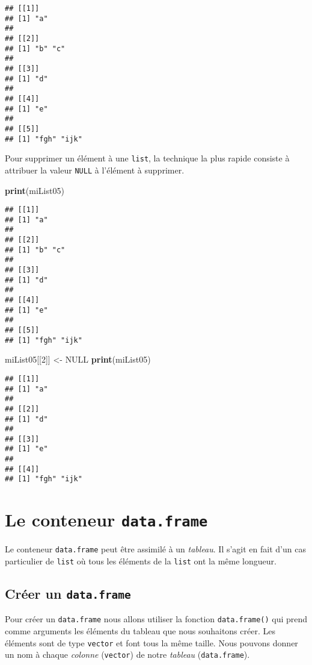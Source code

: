 \documentclass[]{book}
\newenvironment{Shaded}{\begin{snugshade}}{\end{snugshade}}
\newcommand{\KeywordTok}[1]{\textcolor[rgb]{0.13,0.29,0.53}{\textbf{#1}}}
\newcommand{\DecValTok}[1]{\textcolor[rgb]{0.00,0.00,0.81}{#1}}
\newcommand{\StringTok}[1]{\textcolor[rgb]{0.31,0.60,0.02}{#1}}
\newcommand{\OtherTok}[1]{\textcolor[rgb]{0.56,0.35,0.01}{#1}}
\newcommand{\NormalTok}[1]{#1}
\theoremstyle{definition}
\theoremstyle{definition}
\theoremstyle{definition}
\theoremstyle{remark}
\begin{document}
\begin{verbatim}
## [[1]]
## [1] "a"
## 
## [[2]]
## [1] "b" "c"
## 
## [[3]]
## [1] "d"
## 
## [[4]]
## [1] "e"
## 
## [[5]]
## [1] "fgh" "ijk"
\end{verbatim}

Pour supprimer un élément à une \texttt{list}, la technique la plus
rapide consiste à attribuer la valeur \texttt{NULL} à l'élément à
supprimer.

\begin{Shaded}
\begin{Highlighting}[]
\KeywordTok{print}\NormalTok{(miList05)}
\end{Highlighting}
\end{Shaded}

\begin{verbatim}
## [[1]]
## [1] "a"
## 
## [[2]]
## [1] "b" "c"
## 
## [[3]]
## [1] "d"
## 
## [[4]]
## [1] "e"
## 
## [[5]]
## [1] "fgh" "ijk"
\end{verbatim}

\begin{Shaded}
\begin{Highlighting}[]
\NormalTok{miList05[[}\DecValTok{2}\NormalTok{]] <-}\StringTok{ }\OtherTok{NULL}
\KeywordTok{print}\NormalTok{(miList05)}
\end{Highlighting}
\end{Shaded}

\begin{verbatim}
## [[1]]
## [1] "a"
## 
## [[2]]
## [1] "d"
## 
## [[3]]
## [1] "e"
## 
## [[4]]
## [1] "fgh" "ijk"
\end{verbatim}

\hypertarget{l014dataframe}{\section{\texorpdfstring{Le conteneur
\texttt{data.frame}}{Le conteneur data.frame}}\label{l014dataframe}}

Le conteneur \texttt{data.frame} peut être assimilé à un \emph{tableau}.
Il s'agit en fait d'un cas particulier de \texttt{list} où tous les
éléments de la \texttt{list} ont la même longueur.

\subsection{\texorpdfstring{Créer un
\texttt{data.frame}}{Créer un data.frame}}\label{creer-un-data.frame}

Pour créer un \texttt{data.frame} nous allons utiliser la fonction
\texttt{data.frame()} qui prend comme arguments les éléments du tableau
que nous souhaitons créer. Les éléments sont de type \texttt{vector} et
font tous la même taille. Nous pouvons donner un nom à chaque
\emph{colonne} (\texttt{vector}) de notre \emph{tableau}
(\texttt{data.frame}).
\end{document}
